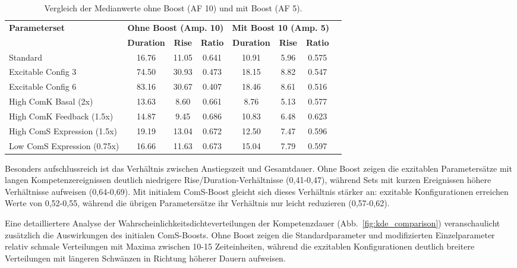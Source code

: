 \documentclass[11pt]{article}
\begin{document}
\begin{table}[h]
    \centering
    \caption{Vergleich der Medianwerte ohne Boost (AF 10) und mit Boost (AF 5).}
    \label{tab:boost-comparison}
    \begin{tabular}{lccccccc}
        \hline
        \multirow{2}{*}{\textbf{Parameterset}} & 
        \multicolumn{3}{c}{\textbf{Ohne Boost (Amp. 10)}} & 
        \multicolumn{3}{c}{\textbf{Mit Boost 10 (Amp. 5)}} \\
        \cline{2-7}
        & \textbf{Duration} & \textbf{Rise} & \textbf{Ratio} & 
        \textbf{Duration} & \textbf{Rise} & \textbf{Ratio} \\
        \hline
        Standard & 16.76 & 11.05 & 0.641 & 10.91 & 5.96 & 0.575 \\
        Excitable Config 3 & 74.50 & 30.93 & 0.473 & 18.15 & 8.82 & 0.547 \\
        Excitable Config 6 & 83.16 & 30.67 & 0.407 & 18.46 & 8.61 & 0.516 \\
        High ComK Basal (2x) & 13.63 & 8.60 & 0.661 & 8.76 & 5.13 & 0.577 \\
        High ComK Feedback (1.5x) & 14.87 & 9.45 & 0.686 & 10.83 & 6.48 & 0.623 \\
        High ComS Expression (1.5x) & 19.19 & 13.04 & 0.672 & 12.50 & 7.47 & 0.596 \\
        Low ComS Expression (0.75x) & 16.66 & 11.63 & 0.673 & 15.04 & 7.79 & 0.597 \\
        \hline
    \end{tabular}
\end{table}

Besonders aufschlussreich ist das Verhältnis zwischen Anstiegszeit und Gesamtdauer. Ohne Boost zeigen die exzitablen Parametersätze mit langen Kompetenzereignissen deutlich niedrigere Rise/Duration-Verhältnisse (0,41-0,47), während Sets mit kurzen Ereignissen höhere Verhältnisse aufweisen (0,64-0,69). Mit initialem ComS-Boost gleicht sich dieses Verhältnis stärker an: exzitable Konfigurationen erreichen Werte von 0,52-0,55, während die übrigen Parametersätze ihr Verhältnis nur leicht reduzieren (0,57-0,62).

Eine detailliertere Analyse der Wahrscheinlichkeitsdichteverteilungen der Kompetenzdauer (Abb.~\ref{fig:kde_comparison}) veranschaulicht zusätzlich die Auswirkungen des initialen ComS-Boosts. Ohne Boost zeigen die Standardparameter und modifizierten Einzelparameter relativ schmale Verteilungen mit Maxima zwischen 10-15 Zeiteinheiten, während die exzitablen Konfigurationen deutlich breitere Verteilungen mit längeren Schwänzen in Richtung höherer Dauern aufweisen.
\end{document}
